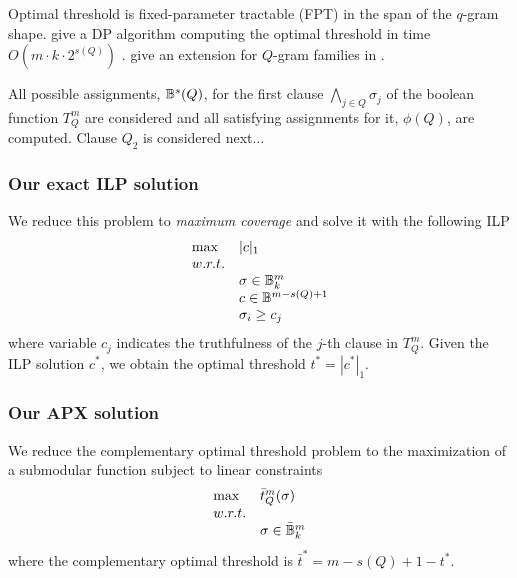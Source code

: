 Optimal threshold is fixed-parameter tractable (FPT) in the span of the $q$-gram shape.
\citeauthor{Burkhardt2001} give a DP algorithm computing the optimal threshold in time $O(m \cdot k \cdot 2^{s(Q)})$ \citep{Burkhardt2001}.
\citeauthor{Kucherov2005} give an extension for $Q$-gram families in \citep{Kucherov2005}.

All possible assignments, \ie $\mathbb {B}^s(Q)$, for the first clause $\bigwedge_{j \in Q}{\sigma_j}$ of the boolean function $T_{Q}^{m}$ are considered and all satisfying assignments for it, \ie $\phi(Q)$, are computed.
Clause $Q_2$ is considered next...

\subsubsection{Our exact ILP solution}

We reduce this problem to \emph{maximum coverage} \citep{NemhauserWolsey99} and solve it with the following ILP
\begin{equation}
\begin{array}{ll}
\text{max} & |c|_1					\\
w.r.t.							\\
& \sigma \in \mathbb {B}^m_k			\\
& c \in \mathbb {B}^{m - s(Q) + 1}		\\
& \sigma_i \geq c_j				\\
\end{array}
\end{equation}
where variable $c_j$ indicates the truthfulness of the $j$-th clause in $T_{Q}^{m}$. Given the ILP solution $c^*$, we obtain the optimal threshold $t^* = |c^*|_1$.

\subsubsection{Our APX solution}

We reduce the complementary optimal threshold problem to the maximization of a submodular function subject to linear constraints
\begin{equation}
\begin{array}{ll}
\text{max} & \bar{t}_{Q}^{m}(\sigma)		\\
w.r.t.								\\
& \sigma \in \bar{\mathbb {B}}^m_k			\\
\end{array}
\end{equation}
where the complementary optimal threshold is $\bar{t}^* = m - s(Q) + 1 - t^*$.

